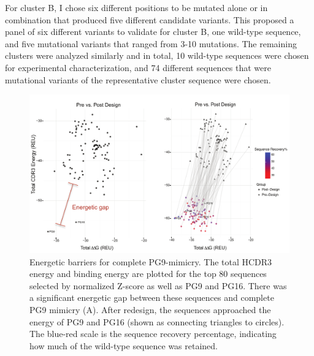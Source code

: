 For cluster B, I chose six different positions to be mutated alone or in combination that produced five different candidate variants. This proposed a panel of six different variants to validate for cluster B, one wild-type sequence, and five mutational variants that ranged from 3-10 mutations. The remaining clusters were analyzed similarly and in total, 10 wild-type sequences were chosen for experimental characterization, and 74 different sequences that were mutational variants of the representative cluster sequence were chosen.


\begin{figure}[!t]
   \centering
   \includegraphics[width=\linewidth]{images/chapter3/figure3_13.pdf} %
   \caption[Energetic Barriers for Complete PG9-Mimicry]{Energetic barriers for complete PG9-mimicry. The total HCDR3 energy and binding energy are plotted for the top 80 sequences selected by normalized Z-score as well as PG9 and PG16. There was a significant energetic gap between these sequences and complete PG9 mimicry (A). After redesign, the sequences approached the energy of PG9 and PG16 (shown as connecting triangles to circles). The blue-red scale is the sequence recovery percentage, indicating how much of the wild-type sequence was retained.}
   \label{fig:figure3_13}
\end{figure}

